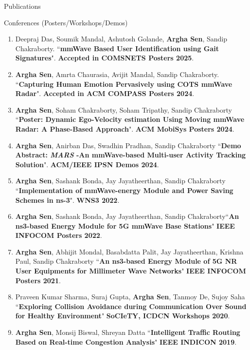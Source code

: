 \documentclass{resume} %
\begin{document}
\begin{rSection}{Publications}
\begin{rSubsection}{Conferences (Posters/Workshops/Demos)}{}{}{}
\begin{enumerate}
				\item Deepraj Das, Soumik Mandal, Ashutosh Golande, \textbf{Argha Sen}, Sandip Chakraborty. 
				``\textbf{mmWave Based User Identification using Gait Signatures}". \textbf{Accepted in COMSNETS Posters 2025}.
				
				\item \textbf{Argha Sen}, Amrta Chaurasia, Avijit Mandal, Sandip Chakraborty. ``\textbf{Capturing Human Emotion Pervasively using COTS mmWave Radar}". \textbf{Accepted in ACM COMPASS Posters 2024}.
				
				\item \textbf{Argha Sen}, Soham Chakraborty, Soham Tripathy, Sandip Chakraborty ``\textbf{Poster: Dynamic Ego-Velocity estimation Using Moving mmWave Radar: A Phase-Based Approach}". \textbf{ACM MobiSys Posters 2024}.
				
				\item \textbf{Argha Sen}, Anirban Das, Swadhin Pradhan, Sandip Chakraborty ``\textbf{Demo Abstract: \textit{MARS} -An mmWave-based Multi-user Activity Tracking Solution}". \textbf{ACM/IEEE IPSN Demos 2024}.
				
				\item \textbf{Argha Sen}, Sashank Bonda, Jay Jayatheerthan, Sandip Chakraborty ``\textbf{Implementation of mmWave-energy Module and Power Saving Schemes in ns-3}". \textbf{WNS3 2022}.
				
				\item \textbf{Argha Sen}, Sashank Bonda, Jay Jayatheerthan, Sandip Chakraborty``\textbf{An ns3-based Energy Module for 5G mmWave Base Stations}" \textbf{IEEE INFOCOM Posters 2022}.
				
				\item \textbf{Argha Sen}, Abhijit Mondal, Basabdatta Palit, Jay Jayatheerthan, Krishna Paul, Sandip Chakraborty ``\textbf{An ns3-based Energy Module of 5G NR User Equipments for Millimeter Wave Networks}" \textbf{IEEE INFOCOM Posters 2021}.
				
				\item Praveen Kumar Sharma, Suraj Gupta, \textbf{Argha Sen}, Tanmoy De, Sujoy Saha ``\textbf{Exploring Collision Avoidance during Communication Over Sound for Healthy Environment}" \textbf{SoCIeTY, ICDCN Workshops 2020}.
				
				\item \textbf{Argha Sen}, Monsij Biswal, Shreyan Datta ``\textbf{Intelligent Traffic Routing Based on Real-time Congestion Analysis}" \textbf{IEEE INDICON 2019}.
				
			\end{enumerate}
			
		\end{rSubsection}{}{}{}{}
		
	\end{rSection}
	
\end{document}

